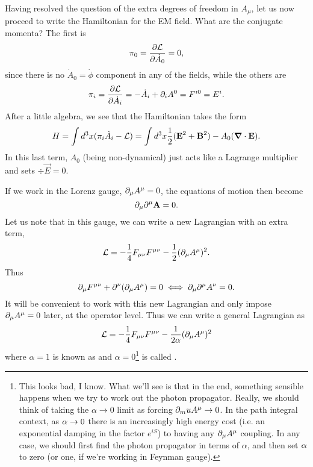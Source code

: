 Having resolved the question of the extra degrees of freedom in $A_\mu$, let us now proceed to write the Hamiltonian for the EM field. What are the conjugate momenta? The first is
$$\pi_0=\frac{\partial \mathcal L}{\partial \dot A_0}=0,$$
since there is no $\dot A_0=\dot \phi$ component in any of the fields, while the others are
$$\pi_i=\frac{\partial \mathcal L}{\partial \dot A_i}=-\dot A_i+\partial_i A^0=F^{i0}=E^i.$$
After a little algebra, we see that the Hamiltonian takes the form
$$H=\int d^3x (\pi_i \dot A_i -\mathcal L)=\int d^3x \frac{1}{2}(\boldsymbol{\mathbf{E}}^2 +\boldsymbol{\mathbf{B}}^2)-A_0(\mbox{\boldmath$ \nabla $} \cdot \boldsymbol{\mathbf{E}}).$$
In this last term, $A_0$ (being non-dynamical) just acts like a Lagrange multiplier and sets $\div \vec E=0$.

If we work in the Lorenz gauge, $\partial_\mu A^\mu=0$, the equations of motion then become
$$\partial_\mu \partial^\mu \boldsymbol{\mathbf{A}}=0.$$ Let us note that in this gauge, we can write a new Lagrangian with an extra term,
$$\mathcal L=-\frac{1}{4}F_{\mu\nu}F^{\mu\nu}-\frac{1}{2}(\partial_\mu A^\mu)^2.$$
Thus
$$\partial_\mu F^{\mu\nu}+\partial^\nu(\partial_\mu A^\mu)= 0 \iff \partial_\mu \partial^\mu A^\nu =0.$$
It will be convenient to work with this new Lagrangian and only impose $\partial_\mu A^\mu=0$ later, at the operator level. Thus we can write a general Lagrangian as
$$\mathcal L=-\frac{1}{4}F_{\mu\nu}F^{\mu\nu}-\frac{1}{2\alpha}(\partial_\mu A^\mu)^2$$
where $\alpha=1$ is known as  and $\alpha=0$\footnote{This looks bad, I know. What we'll see is that in the end, something sensible happens when we try to work out the photon propagator. Really, we should think of taking the $\alpha\to 0$ limit as forcing $\partial_mu A^\mu\to 0$. In the path integral context, as $\alpha\to 0$ there is an increasingly high energy cost (i.e. an exponential damping in the factor $e^{iS}$) to having any $\partial_\mu A^\mu$ coupling. In any case, we should first find the photon propagator in terms of $\alpha$, and then set $\alpha$ to zero (or one, if we're working in Feynman gauge).} is called .